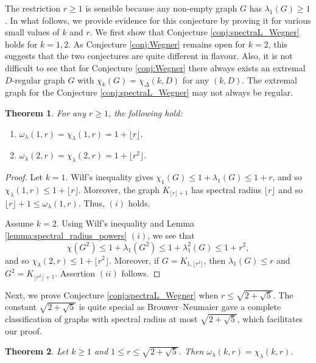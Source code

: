 \documentclass[10pt,a4paper]{article}
\theoremstyle{plain}
\newtheorem{theorem}{Theorem}[section]
\numberwithin{equation}{section}
\begin{document}
The restriction $r\ge 1$ is sensible because any non-empty graph $G$ has $\lambda_1(G)\ge 1$. In what follows, we provide evidence for this conjecture by proving it for various small values of $k$ and $r$. We first show that Conjecture \ref{conj:spectraL_Wegner} holds for $k=1,2$. As Conjecture \ref{conj:Wegner} remains open for $k=2$, this suggests that the two conjectures are quite different in flavour. Also, it is not difficult to see that for Conjecture \ref{conj:Wegner} there always exists an extremal $D$-regular graph $G$ with $\chi_k(G) = \chi_\Delta(k, D)$ for any $(k, D)$. The extremal graph for the Conjecture \ref{conj:spectraL_Wegner} may not always be regular.   

\begin{theorem}\label{thm:spectral_Wegner_k_1_2} For any $r\ge 1$, the following hold:
\begin{enumerate}[$(i)$]
    \item $\omega_\lambda(1,r) = \chi_\lambda(1,r) = 1 + \lfloor r\rfloor$.
    \item $\omega_\lambda(2,r) = \chi_\lambda(2,r) = 1 + \lfloor r^2\rfloor $.
\end{enumerate}
\end{theorem}

\begin{proof} Let $k=1$. Wilf's inequality gives $\chi_1(G)\le 1 + \lambda_1(G) \le 1 +r$, and so $\chi_\lambda(1,r)\le 1 + \lfloor r\rfloor$. Moreover, the graph $K_{\lfloor r\rfloor +1}$ has spectral radius $\lfloor r\rfloor$ and so $\lfloor r\rfloor +1 \le \omega_\lambda(1,r)$.
Thus, $(i)$ holds. 

Assume $k=2$. Using Wilf's inequality and Lemma \ref{lemma:spectral_radius_powers} $(i)$, we see that 
\[ \chi(G^2)\le 1 + \lambda_1(G^2)\le 1 + \lambda_1^2(G) \le 1 + r^2,\]
and so $\chi_\lambda(2,r)\le 1 + \lfloor r^2\rfloor$. Moreover, if $G =K_{1,\lfloor r^2\rfloor}$, then $\lambda_1(G)\le r$ and $G^2 = K_{\lfloor r^2\rfloor+1}$. Assertion $(ii)$ follows. 
\end{proof}

Next, we prove Conjecture \ref{conj:spectraL_Wegner} when $r\le \sqrt{2+\sqrt{5}}$. The constant $\sqrt{2+\sqrt{5}}$ is quite special as Brouwer--Neumaier \cite{Brouwer_Neumaier_1989} gave a complete classification of graphs with spectral radius at most $\sqrt{2+\sqrt{5}}$, which facilitates our proof.  

\begin{theorem} Let $k\ge 1$ and $1\le r\le \sqrt{2+\sqrt{5}}$. Then $\omega_\lambda(k,r) = \chi_\lambda(k,r)$.
\end{theorem}
\end{document}
